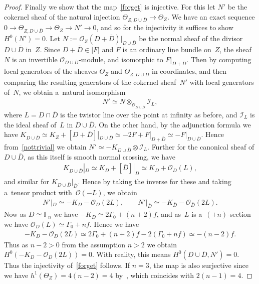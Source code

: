 \documentclass[pdftex]{sigma}
\numberwithin{equation}{section}
\begin{document}
\begin{proof}
Finally we show that the map~\eqref{forget} is injective.
For this let $N'$ be the cokernel sheaf of the natural injection $\Theta_{Z,D\cup\overline D}\to \Theta_Z$.
We have an exact sequence $0\to \Theta_{Z, D\cup \overline D}\to \Theta_Z\to N'\to 0$, and so for the injectivity it
suf\/f\/ices to show $H^0(N') = 0$.
Let $N:=\mathscr O_Z(D+\overline D)|_{D\cup\overline D}$ be the normal sheaf of the divisor $D\cup \overline D$ in~$Z$.
Since $D+\overline D\in |F|$ and $F$ is an ordinary line bundle on~$Z$, the sheaf~$N$ is an invertible $\mathscr
O_{D\cup\overline D}$-module, and isomorphic to $F|_{D+\overline D}$.
Then by computing local generators of the sheaves $\Theta_{Z}$ and $\Theta_{Z,D\cup\overline D}$ in coordinates, and
then comparing the resulting generators of the cokernel sheaf~$N'$ with local generators of~$N$, we obtain a~natural
isomorphism
\begin{gather}
\label{nottrivial}
N'\simeq N\otimes_{\mathscr O_{D\cup\overline D}}\mathscr I_{L},
\end{gather}
where $L=D\cap \overline D$ is the twistor line over the point at inf\/inity as before, and $\mathscr I_L$ is the ideal
sheaf of~$L$ in $D\cup \overline D$.
On the other hand, by the adjunction formula we have $K_{D\cup\overline D} \simeq K_Z + [D+\overline D]|_{D\cup\overline
D}\simeq -2F + F|_{D+\overline D}\simeq -F|_{D\cup\overline D}$.
Hence from~\eqref{nottrivial} we obtain $N'\simeq -K_{D\cup\overline D}\otimes \mathscr I_L$.
Further for the canonical sheaf of $D\cup\overline D$, as this itself is smooth normal crossing, we have
\begin{gather*}%
K_{D\cup\overline D}|_D \simeq K_D +[\overline D]|_D \simeq K_D+\mathscr O_D(L),
\end{gather*}
and similar for $K_{D\cup\overline D}|_{\overline D}$.
Hence by taking the inverse for these and taking a~tensor product with~$\mathscr O(-L)$, we obtain
\begin{gather}
\label{N''}
N'|_D\simeq -K_D-\mathscr O_D(2L),
\qquad
N'|_{\overline D}\simeq -K_{\overline D}-\mathscr O_{\overline D}(2L).
\end{gather}
Now as $D\simeq\mathbb{F}_n$ we have $-K_D\simeq 2\Gamma_0+(n+2)f$, and as~$L$ is a~$(+n)$-section
we have $\mathscr O_D(L)\simeq \Gamma_0+nf$.
Hence we have
\begin{gather}
\label{N'}
-K_D-\mathscr O_D(2L) \simeq 2\Gamma_0+(n+2)f -2(\Gamma_0 + n f) \simeq -(n-2)f.
\end{gather}
Thus as $n-2>0$ from the assumption $n>2$ we obtain $H^0(-K_D-\mathscr O_D(2L))=0$.
With reality, this means $H^0(D\cup \overline D,N')=0$.
Thus the injectivity of~\eqref{forget} follows.
If $n=3$, the map is also surjective since we have $h^1(\Theta_Z) = 4(n-2) = 4$ by~\cite[Proposition~2.1]{HonCMP2}, which
coincides with $2(n-1) = 4$.
\end{proof}
\end{document}
